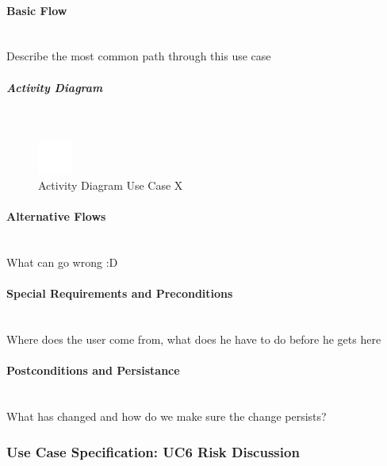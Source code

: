 \paragraph*{Basic Flow} \mbox{}\\

Describe the most common path through this use case

\subparagraph{Activity Diagram}\mbox{}\\
\begin{figure}[h]
	\centering
	\includegraphics[width=0.1\textwidth]{Content/Domain/placeholder.png}
	\caption{Activity Diagram Use Case X}
	\label{fig:label55}
\end{figure}

\paragraph*{Alternative Flows}\mbox{}\\
What can go wrong :D

\paragraph*{Special Requirements and Preconditions}\mbox{}\\
Where does the user come from, what does he have to do before he gets here

\paragraph*{Postconditions and Persistance}\mbox{}\\
What has changed and how do we make sure the change persists?

\newpage
\subsubsection{Use Case Specification: \ac{UC}6 Risk Discussion}
\label{sec:domainBbg}

